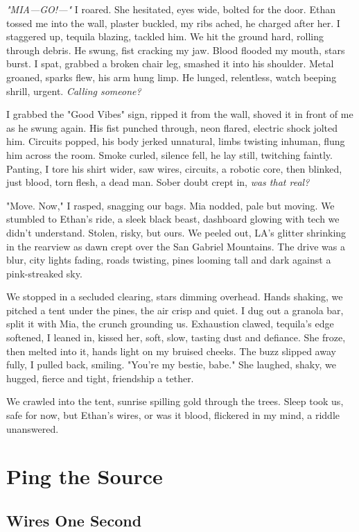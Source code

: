\documentclass[12pt,oneside]{book} %
\begin{document}
\textit{"MIA—GO!—"} I roared. She hesitated, eyes wide, bolted for the door. Ethan tossed me into the wall, plaster buckled, my ribs ached, he charged after her. I staggered up, tequila blazing, tackled him. We hit the ground hard, rolling through debris. He swung, fist cracking my jaw. Blood flooded my mouth, stars burst. I spat, grabbed a broken chair leg, smashed it into his shoulder. Metal groaned, sparks flew, his arm hung limp. He lunged, relentless, watch beeping shrill, urgent. \textit{Calling someone?}

I grabbed the "Good Vibes" sign, ripped it from the wall, shoved it in front of me as he swung again. His fist punched through, neon flared, electric shock jolted him. Circuits popped, his body jerked unnatural, limbs twisting inhuman, flung him across the room. Smoke curled, silence fell, he lay still, twitching faintly. Panting, I tore his shirt wider, saw wires, circuits, a robotic core, then blinked, just blood, torn flesh, a dead man. Sober doubt crept in, \textit{was that real?}

"Move. Now," I rasped, snagging our bags. Mia nodded, pale but moving. We stumbled to Ethan’s ride, a sleek black beast, dashboard glowing with tech we didn’t understand. Stolen, risky, but ours. We peeled out, LA’s glitter shrinking in the rearview as dawn crept over the San Gabriel Mountains. The drive was a blur, city lights fading, roads twisting, pines looming tall and dark against a pink-streaked sky.

We stopped in a secluded clearing, stars dimming overhead. Hands shaking, we pitched a tent under the pines, the air crisp and quiet. I dug out a granola bar, split it with Mia, the crunch grounding us. Exhaustion clawed, tequila’s edge softened, I leaned in, kissed her, soft, slow, tasting dust and defiance. She froze, then melted into it, hands light on my bruised cheeks. The buzz slipped away fully, I pulled back, smiling. "You’re my bestie, babe." She laughed, shaky, we hugged, fierce and tight, friendship a tether.

We crawled into the tent, sunrise spilling gold through the trees. Sleep took us, safe for now, but Ethan’s wires, or was it blood, flickered in my mind, a riddle unanswered.

\part{Ping the Source}

\chapter{Wires One Second}
\end{document}
